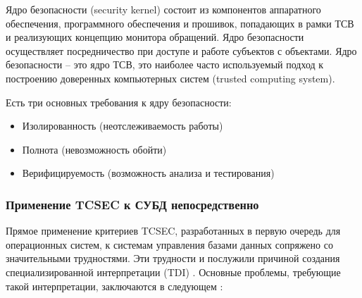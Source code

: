 Ядро безопасности (security kernel) состоит из компонентов аппаратного обеспечения, программного обеспечения и прошивок, попадающих в рамки ТСВ и реализующих концепцию монитора обращений.
Ядро безопасности осуществляет посредничество при доступе и работе субъектов с объектами. Ядро безопасности – это ядро ТСВ, это наиболее часто используемый подход к построению доверенных компьютерных систем (trusted computing system). \cite{CISSP}

Есть три основных требования к ядру безопасности:
\begin{itemize}
	\item Изолированность (неотслеживаемость работы)
	\item Полнота (невозможность обойти)
	\item Верифицируемость (возможность анализа и тестирования)
\end{itemize}

\subsubsection{Применение TCSEC к СУБД непосредственно}
Прямое применение критериев TCSEC, разработанных в первую очередь для операционных систем, к системам управления базами данных сопряжено со значительными трудностями. Эти трудности и послужили причиной создания специализированной интерпретации (TDI) \cite{PurpleBook}. Основные проблемы, требующие такой интерпретации, заключаются в следующем \cite[Introduction, Section 1]{PurpleBook}:
	
